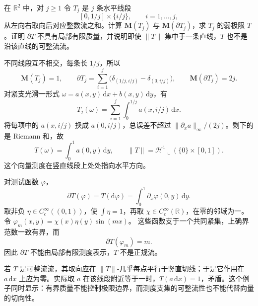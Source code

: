 \begin{exercise}\label{g3:ex:current-nontangent-weak-limit}
	在 \(\mathbb R^2\) 中，对 \(j\ge1\) 令 \(T_j\) 是 \(j\) 条水平线段
	\[
		[0,1/j]\times\{i/j\},\qquad i=1,\ldots,j,
	\]
	从左向右取向后对应整数流之和。计算 \(\mathbf M(T_j)\) 与 \(\mathbf M(\partial T_j)\)，求 \(T_j\) 的弱极限 \(T\)。证明 \(\partial T\) 不具有局部有限质量，并说明即使 \(\|T\|\) 集中于一条直线，\(T\) 也不是沿该直线的可整流流。
\end{exercise}
\begin{solution}
	不同线段互不相交，每条长 \(1/j\)，所以
	\[
		\mathbf M(T_j)=1,\qquad
		\partial T_j=\sum_{i=1}^j
		\bigl(\delta_{(1/j,i/j)}-\delta_{(0,i/j)}\bigr),
		\qquad \mathbf M(\partial T_j)=2j.
	\]
	对紧支光滑一形式 \(\omega=a(x,y)\,\mathrm dx+b(x,y)\,\mathrm dy\)，有
	\[
		T_j(\omega)=\sum_{i=1}^j\int_0^{1/j}a(x,i/j)\,\mathrm dx.
	\]
	将每项中的 \(a(x,i/j)\) 换成 \(a(0,i/j)\)，总误差不超过
	\(\|\partial_xa\|_\infty/(2j)\)。剩下的是 Riemann 和，故
	\[
		T(\omega)=\int_0^1a(0,y)\,\mathrm dy,\qquad
		\|T\|=\mathcal H^1\llcorner(\{0\}\times[0,1]).
	\]
	这个向量测度在竖直线段上处处指向水平方向。

	对测试函数 \(\varphi\)，
	\[
		\partial T(\varphi)=T(\mathrm d\varphi)
		=\int_0^1\partial_x\varphi(0,y)\,\mathrm dy.
	\]
	取非负 \(\eta\in C_c^\infty((0,1))\)，使 \(\int\eta=1\)，再取 \(\chi\in C_c^\infty(\mathbb R)\)，在零的邻域为一。令
	\(\varphi_m(x,y)=\chi(x)\eta(y)\sin(mx)\)。
	这些函数支于一个共同紧集，上确界范数一致有界，而
	\[
		\partial T(\varphi_m)=m.
	\]
	因此 \(\partial T\) 不能由局部有限测度表示，\(T\) 不是正规流。

	若 \(T\) 是可整流流，其取向应在 \(\|T\|\)-几乎每点平行于竖直切线；于是它作用在 \(a\,\mathrm dx\) 上应为零。实际取 \(a\) 在该线段附近等于一时，\(T(a\,\mathrm dx)=1\)，矛盾。这个例子同时显示：有界质量不能控制极限边界，而测度支集的可整流性也不能代替向量的切向性。
\end{solution}

